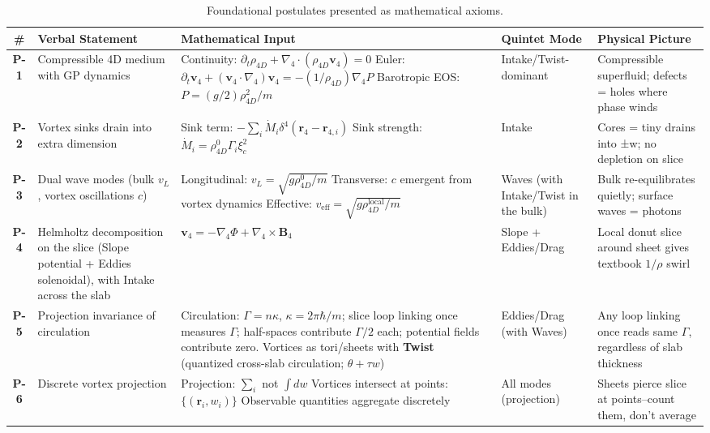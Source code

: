 \begin{table}[H]
\centering
\small
\begin{tabularx}{\textwidth}{|c|X|X|X|X|}
\hline
\# & Verbal Statement & Mathematical Input & Quintet Mode & Physical Picture \\
\hline
\textbf{P-1} & Compressible 4D medium with GP dynamics & Continuity: $\partial_t \rho_{4D} + \nabla_4 \cdot (\rho_{4D} \mathbf{v}_4) = 0$ Euler: $\partial_t \mathbf{v}_4 + (\mathbf{v}_4 \cdot \nabla_4) \mathbf{v}_4 = -(1/\rho_{4D}) \nabla_4 P$ Barotropic EOS: $P = (g/2) \rho_{4D}^2 / m$ & Intake/Twist-dominant & Compressible superfluid; defects = holes where phase winds \\
\hline
\textbf{P-2} & Vortex sinks drain into extra dimension & Sink term: $-\sum_i \dot{M}_i \delta^4(\mathbf{r}_4 - \mathbf{r}_{4,i})$ Sink strength: $\dot{M}_i = \rho_{4D}^0 \Gamma_i \xi_c^2$ & Intake & Cores = tiny drains into ±w; no depletion on slice \\
\hline
\textbf{P-3} & Dual wave modes (bulk $v_L$, vortex oscillations $c$) & Longitudinal: $v_L = \sqrt{g \rho_{4D}^0 / m}$ Transverse: $c$ emergent from vortex dynamics Effective: $v_{\text{eff}} = \sqrt{g \rho_{4D}^{\text{local}} / m}$ & Waves (with Intake/Twist in the bulk) & Bulk re-equilibrates quietly; surface waves = photons \\
\hline
\textbf{P-4} & Helmholtz decomposition on the slice (Slope potential + Eddies solenoidal), with Intake across the slab & $\mathbf{v}_4 = -\nabla_4 \Phi + \nabla_4 \times \mathbf{B}_4$ & Slope + Eddies/Drag & Local donut slice around sheet gives textbook $1/\rho$ swirl \\
\hline
\textbf{P-5} & Projection invariance of circulation & Circulation: $\Gamma = n \kappa$, $\kappa = 2 \pi \hbar / m$; slice loop linking once measures $\Gamma$; half-spaces contribute $\Gamma/2$ each; potential fields contribute zero. Vortices as tori/sheets with \textbf{Twist} (quantized cross-slab circulation; $\theta+\tau w$) & Eddies/Drag (with Waves) & Any loop linking once reads same $\Gamma$, regardless of slab thickness \\
\hline
\textbf{P-6} & Discrete vortex projection & Projection: $\sum_i$ not $\int dw$ Vortices intersect at points: $\{(\mathbf{r}_i, w_i)\}$ Observable quantities aggregate discretely & All modes (projection) & Sheets pierce slice at points--count them, don't average \\
\hline
\end{tabularx}
\caption{Foundational postulates presented as mathematical axioms.}
\label{tab:postulates}
\end{table}

